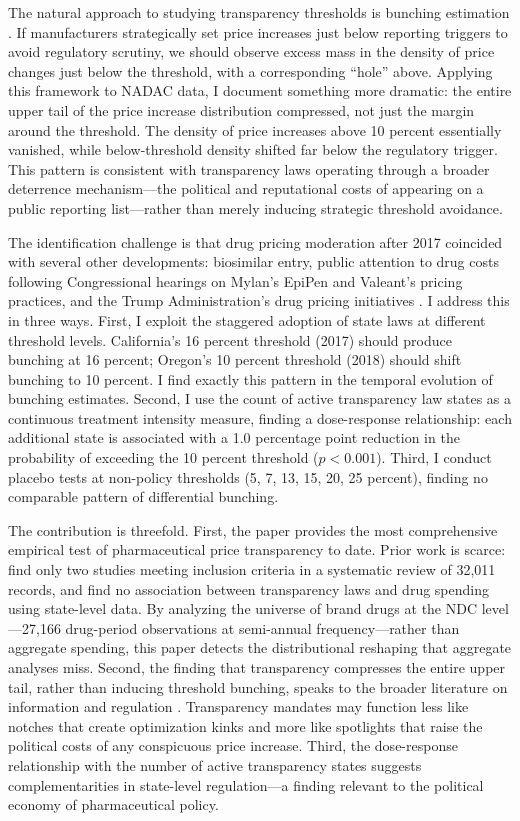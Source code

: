 \documentclass[12pt]{article}
\begin{document}
The natural approach to studying transparency thresholds is bunching estimation \citep{saez2010, chetty2011, kleven2013}. If manufacturers strategically set price increases just below reporting triggers to avoid regulatory scrutiny, we should observe excess mass in the density of price changes just below the threshold, with a corresponding ``hole'' above. Applying this framework to NADAC data, I document something more dramatic: the entire upper tail of the price increase distribution compressed, not just the margin around the threshold. The density of price increases above 10 percent essentially vanished, while below-threshold density shifted far below the regulatory trigger. This pattern is consistent with transparency laws operating through a broader deterrence mechanism---the political and reputational costs of appearing on a public reporting list---rather than merely inducing strategic threshold avoidance.

The identification challenge is that drug pricing moderation after 2017 coincided with several other developments: biosimilar entry, public attention to drug costs following Congressional hearings on Mylan's EpiPen and Valeant's pricing practices, and the Trump Administration's drug pricing initiatives \citep{frank2019}. I address this in three ways. First, I exploit the staggered adoption of state laws at different threshold levels. California's 16 percent threshold (2017) should produce bunching at 16 percent; Oregon's 10 percent threshold (2018) should shift bunching to 10 percent. I find exactly this pattern in the temporal evolution of bunching estimates. Second, I use the count of active transparency law states as a continuous treatment intensity measure, finding a dose-response relationship: each additional state is associated with a 1.0 percentage point reduction in the probability of exceeding the 10 percent threshold ($p < 0.001$). Third, I conduct placebo tests at non-policy thresholds (5, 7, 13, 15, 20, 25 percent), finding no comparable pattern of differential bunching.

The contribution is threefold. First, the paper provides the most comprehensive empirical test of pharmaceutical price transparency to date. Prior work is scarce: \citet{wallach2024} find only two studies meeting inclusion criteria in a systematic review of 32,011 records, and \citet{sood2021} find no association between transparency laws and drug spending using state-level data. By analyzing the universe of brand drugs at the NDC level---27,166 drug-period observations at semi-annual frequency---rather than aggregate spending, this paper detects the distributional reshaping that aggregate analyses miss. Second, the finding that transparency compresses the entire upper tail, rather than inducing threshold bunching, speaks to the broader literature on information and regulation \citep{stigler1961, jin2005, dranove2003}. Transparency mandates may function less like notches that create optimization kinks and more like spotlights that raise the political costs of any conspicuous price increase. Third, the dose-response relationship with the number of active transparency states suggests complementarities in state-level regulation---a finding relevant to the political economy of pharmaceutical policy.
\end{document}
